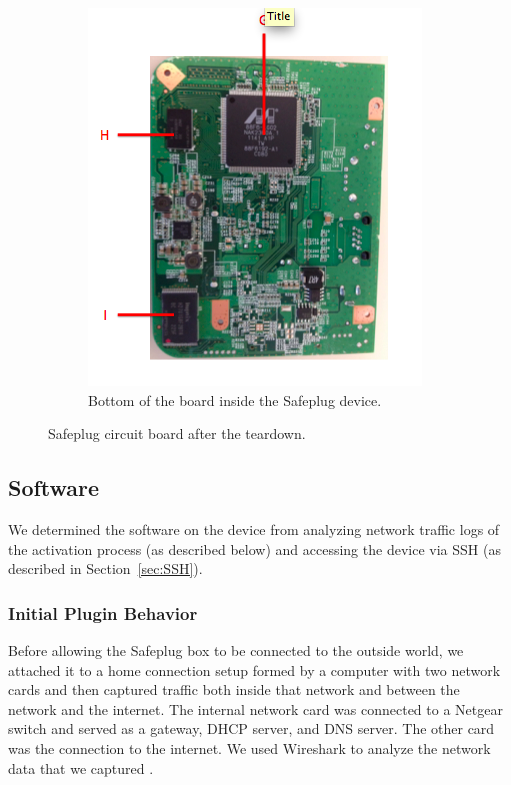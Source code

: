 \begin{figure}[htb]
\qquad
\begin{subfigure}[b]{.3\textwidth}
\includegraphics[width=\textwidth]{safeplug_listed_bottom}
\caption{Bottom of the board inside the Safeplug device.}
\label{fig:bottom}
\end{subfigure}
\caption{Safeplug circuit board after the teardown.}
\end{figure}


\subsection{Software}
\label{software}
We determined the software on the device from analyzing network traffic logs of the activation process (as described below) and accessing the device via SSH (as described in Section~\ref{sec:SSH}).

\subsubsection{Initial Plugin Behavior}
Before allowing the Safeplug box to be connected to the outside world, we attached it to a home connection setup formed by a computer with two network cards and then captured traffic both inside that network and between the network and the internet.  The internal network card was connected to a Netgear switch and served as a gateway, DHCP server, and DNS server.  The other card was the connection to the internet.  We used Wireshark to analyze the network data that we captured \cite{wireshark}.  

